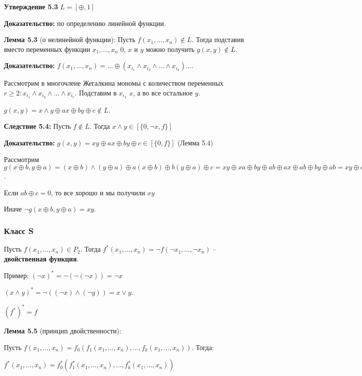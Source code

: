 \documentclass[openany]{article}
\begin{document}
   \textbf{Утверждение 5.3} $L = [{\oplus, 1}]$

   \textbf{Доказательство:} по определению линейной функции.

   \textbf{Лемма 5.3} (о нелинейной функции): Пусть $f(x_1, \ldots, x_n) \notin L$. Тогда подставив вместо переменных функции $x_1, \ldots, x_n$ 0, $x$ и $y$ можно получить $g(x, y) \notin L$.

   \textbf{Доказательство:} $f(x_1,\ldots,x_n) = \ldots \oplus (x_{i_1} \wedge x_{i_2} \wedge \ldots \wedge x_{i_k}) \ldots$.

   Рассмотрим в многочлене Жегалкина мономы с количеством переменных $r \ge 2: x_{i_1} \wedge x_{i_2} \wedge \ldots \wedge x_{i_r}$. Подставим в $x_{i_1}$ $x$, а во все остальное $y$.

   $g(x, y) = x \wedge y \oplus ax \oplus by \oplus c \notin L$.

   \textbf{Следствие 5.4:} Пусть $f \notin L$. Тогда $x \wedge y \in [\{0, \neg x, f\}]$

   \textbf{Доказательство:} $g(x, y) = xy \oplus ax \oplus by \oplus c \in [\{0, f\}]$ (Лемма 5.4)

   Рассмотрим $g(x \oplus b, y \oplus a) = (x \oplus b) \wedge (y \oplus a) \oplus a(x \oplus b) \oplus b(y \oplus a) \oplus c = xy \oplus xa \oplus by \oplus ab \oplus ax \oplus ab \oplus by \oplus ab = xy \oplus ab \oplus c$.

   Если $ab \oplus c = 0$, то все хорошо и мы получили $xy$

   Иначе $\neg g(x \oplus b, y \oplus a) = xy$.

   \subsubsection{Класс S}

   Пусть $f(x_1, \ldots, x_n) \in P_2$. Тогда $f^*(x_1, \ldots, x_n) = \neg f(\neg x_1, \ldots, \neg x_n)$ -- \textbf{двойственная функция}.

   Пример: $(\neg x)^* = \neg(\neg(\neg x)) = \neg x$

   $(x \wedge y)^* = \neg((\neg x) \wedge (\neg y)) = x \vee y$.

   $(f^*)^* = f$

   \textbf{Лемма 5.5} (принцип двойственности):

   Пусть $f(x_1,\ldots,x_n) = f_0(f_1(x_1,\ldots,x_n),\ldots,f_k(x_1,\ldots,x_n))$. Тогда:

   $f^*(x_1,\ldots,x_n) = f_0^*(f_1^*(x_1,\ldots,x_n),\ldots,f_k^*(x_1,\ldots,x_n))$
\end{document}
